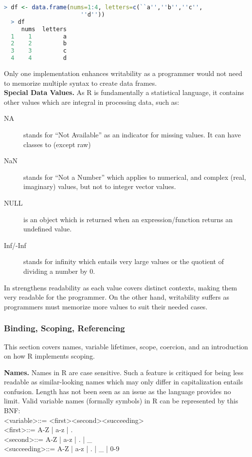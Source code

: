 \documentclass[12pt]{article}
\begin{document}
\begin{lstlisting}[language=R ]
  > df <- data.frame(nums=1:4, letters=c(``a'',''b'',''c'',
                      ''d''))
  > df
     nums  letters
  1    1         a
  2    2         b
  3    3         c
  4    4         d
\end{lstlisting}

Only one implementation enhances writability as a programmer would not need to memorize multiple syntax to create data frames.\\

\textbf{Special Data Values.} As R is fundamentally a statistical language, it contains other values which are integral in processing data, such as:
\begin{description}
\item[NA] stands for ``Not Available'' as an indicator for missing values. It can have classes to (except raw)
\item[NaN] stands for ``Not a Number'' which applies to numerical, and complex (real, imaginary) values, but not to integer vector values.
\item[NULL] is an object which is returned when an expression/function returns an undefined value.
\item[Inf/-Inf] stands for infinity which entails very large values or the quotient of dividing a number by 0.
\end{description}

In strengthens readability as each value covers distinct contexts, making them very readable for the programmer. On the other hand, writability suffers as programmers must memorize more values to suit their needed cases.

\subsubsection{Binding, Scoping, Referencing}

This section covers names, variable lifetimes, scope, coercion, and an introduction on how R implements scoping.

\textbf{Names.} Names in R are case sensitive. Such a feature is critiqued for being less readable as similar-looking names which may only differ in capitalization entails confusion. Length has not been seen as an issue as the language provides no limit. Valid variable names (formally symbols) in R can be represented by this BNF: \\
\textless variable\textgreater ::= \textless first\textgreater \textless second\textgreater \textless succeeding\textgreater* \\
\textless first\textgreater ::= A-Z | a-z | . \\
\textless second\textgreater ::= A-Z | a-z | . | \_ \\
\textless succeeding\textgreater ::= A-Z | a-z | . | \_ | 0-9 \\
\end{document}
